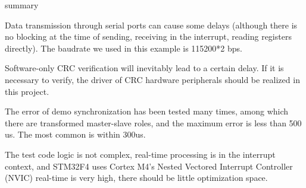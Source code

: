 \begin{frame}[fragile]{summary}

Data transmission through serial ports can cause some delays (although there is no blocking at the time of sending, receiving in the interrupt, reading registers directly). The baudrate we used in this example is 115200*2 bps.



Software-only CRC verification will inevitably lead to a certain delay. If it is necessary to verify, the driver of CRC hardware peripherals should be realized in this project.

The error of demo synchronization has been tested many times, among which there are transformed master-slave roles, and the maximum error is less than 500 us. The most common is within 300us.

The test code logic is not complex, real-time processing is in the interrupt context, and STM32F4 uses Cortex M4's Nested Vectored Interrupt Controller (NVIC) real-time is very high, there should be little optimization space.

\end{frame}
